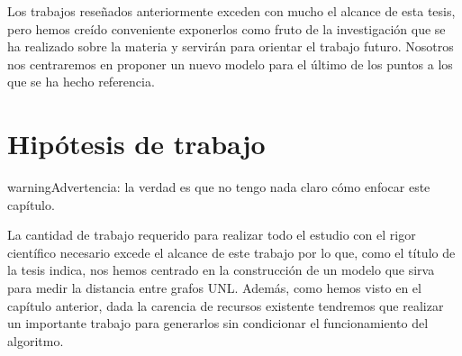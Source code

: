 \documentclass[a4paper,12pt,spanish]{book}
\begin{document}
Los trabajos reseñados anteriormente exceden con mucho el alcance de esta tesis, pero hemos
creído conveniente exponerlos como fruto de la investigación que se ha realizado sobre la
materia y servirán para orientar el trabajo futuro. Nosotros nos centraremos en proponer
un nuevo modelo para el último de los puntos a los que se ha hecho referencia.
\newpage

\chapter{Hipótesis de trabajo}
\label{3.hypothesis/index:hipotesis-de-trabajo}\label{3.hypothesis/index::doc}
\begin{notice}{warning}{Advertencia:}
la verdad es que no tengo nada claro cómo enfocar este capítulo.
\end{notice}

La cantidad de trabajo requerido para realizar todo el estudio con el rigor científico
necesario excede el alcance de este trabajo por lo que, como el título de la tesis indica,
nos hemos centrado en la construcción de un modelo que sirva para medir la distancia
entre grafos UNL. Además, como hemos visto en el capítulo anterior, dada la carencia de
recursos existente tendremos que realizar un importante trabajo para generarlos sin
condicionar el funcionamiento del algoritmo.
\end{document}
